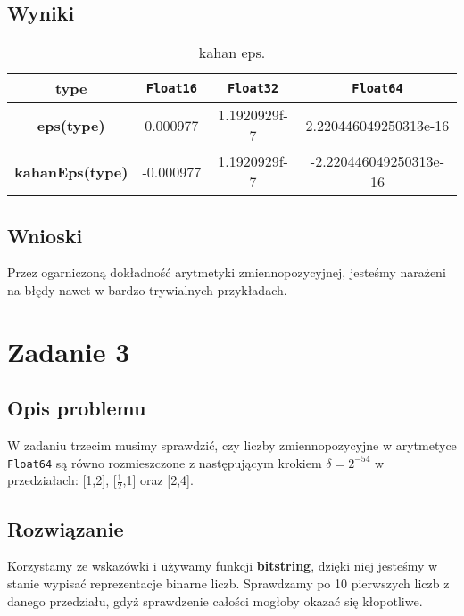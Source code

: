 \documentclass{article}
\begin{document}
\begin{center}
    \subsection{Wyniki}
     \begin{table}[h!]
     \centering
     \begin{tabular}{||c c c c||} 
     \hline
     \textbf{type} & \texttt{Float16} & \texttt{Float32} & \texttt{Float64} \\ [0.5ex]
     \hline\hline
     \textbf{eps(type)} & 0.000977 & 1.1920929f-7 & 2.220446049250313e-16  \\ 
     \textbf{kahanEps(type)} & -0.000977 & 1.1920929f-7 & -2.220446049250313e-16 \\
     \hline
     \end{tabular}
     \caption{kahan eps.}
     \label{table:7}
     \end{table}
    
    \subsection{Wnioski}
    \large Przez ogarniczoną dokładność arytmetyki zmiennopozycyjnej, jesteśmy narażeni na błędy nawet w bardzo trywialnych przykładach.
    \section{Zadanie 3}
    \subsection{Opis problemu}
    \large W zadaniu trzecim musimy sprawdzić, czy liczby zmiennopozycyjne w arytmetyce \texttt{Float64} są równo
     rozmieszczone z następującym krokiem \(\delta = 2^{-54}\) w przedziałach: [1,2], [\(\frac{1}{2}\),1] oraz [2,4].
    \subsection{Rozwiązanie}
     \large Korzystamy ze wskazówki i używamy funkcji \textbf{bitstring}, dzięki niej jesteśmy w stanie wypisać reprezentacje binarne liczb.
      Sprawdzamy po 10 pierwszych liczb z danego przedziału, gdyż sprawdzenie całości mogłoby okazać się kłopotliwe.

\end{center}
\end{document}
